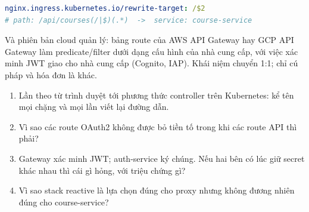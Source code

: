 \begin{lstlisting}[language=yaml]
nginx.ingress.kubernetes.io/rewrite-target: /$2
# path: /api/courses(/|$)(.*)  ->  service: course-service
\end{lstlisting}

Và phiên bản cloud quản lý: bảng route của AWS API Gateway hay GCP API
Gateway làm predicate/filter dưới dạng cấu hình của nhà cung cấp, với
việc xác minh JWT giao cho nhà cung cấp (Cognito, IAP). Khái niệm
chuyển 1:1; chỉ cú pháp và hóa đơn là khác.

\begin{quiz}
\begin{enumerate}
  \item Lần theo  từ trình duyệt tới phương
  thức controller trên Kubernetes: kể tên mọi chặng và mọi lần viết lại
  đường dẫn.
  \item Vì sao các route OAuth2 không được bỏ tiền tố trong khi các
  route API thì phải?
  \item Gateway xác minh JWT; auth-service ký chúng. Nếu hai bên có lúc
  giữ secret khác nhau thì cái gì hỏng, với triệu chứng gì?
  \item Vì sao stack reactive là lựa chọn đúng cho proxy nhưng không
  đương nhiên đúng cho course-service?
\end{enumerate}
\end{quiz}
